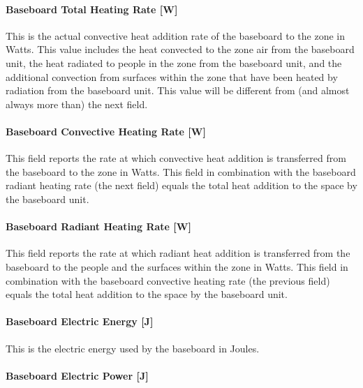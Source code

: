 \paragraph{Baseboard Total Heating Rate {[}W{]}}\label{baseboard-total-heating-rate-w-2}

This is the actual convective heat addition rate of the baseboard to the zone in Watts. This value includes the heat convected to the zone air from the baseboard unit, the heat radiated to people in the zone from the baseboard unit, and the additional convection from surfaces within the zone that have been heated by radiation from the baseboard unit. This value will be different from (and almost always more than) the next field.

\paragraph{Baseboard Convective Heating Rate {[}W{]}}\label{baseboard-convective-heating-rate-w-2}

This field reports the rate at which convective heat addition is transferred from the baseboard to the zone in Watts.  This field in combination with the baseboard radiant heating rate (the next field) equals the total heat addition to the space by the baseboard unit.

\paragraph{Baseboard Radiant Heating Rate {[}W{]}}\label{baseboard-radiant-heating-rate-w-2}

This field reports the rate at which radiant heat addition is transferred from the baseboard to the people and the surfaces within the zone in Watts.  This field in combination with the baseboard convective heating rate (the previous field) equals the total heat addition to the space by the baseboard unit.

\paragraph{Baseboard Electric Energy {[}J{]}}\label{baseboard-electric-energy-j-000}

This is the electric energy used by the baseboard in Joules.

\paragraph{Baseboard Electric Power {[}J{]}}\label{baseboard-electric-power-j}

